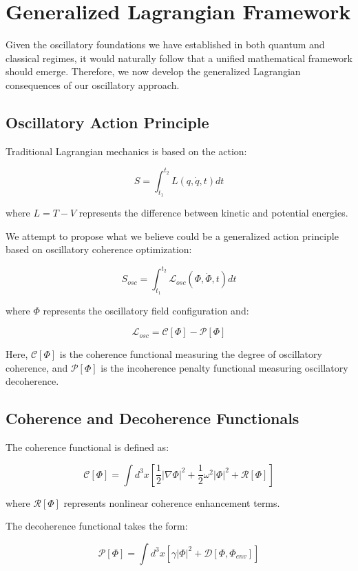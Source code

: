\documentclass[11pt]{article}
\theoremstyle{remark}
\begin{document}
\section{Generalized Lagrangian Framework}

Given the oscillatory foundations we have established in both quantum and classical regimes, it would naturally follow that a unified mathematical framework should emerge. Therefore, we now develop the generalized Lagrangian consequences of our oscillatory approach.

\subsection{Oscillatory Action Principle}

Traditional Lagrangian mechanics is based on the action:

$$S = \int_{t_1}^{t_2} L(q, \dot{q}, t) dt$$

where $L = T - V$ represents the difference between kinetic and potential energies.

We attempt to propose what we believe could be a generalized action principle based on oscillatory coherence optimization:

$$S_{osc} = \int_{t_1}^{t_2} \mathcal{L}_{osc}(\Phi, \dot{\Phi}, t) dt$$

where $\Phi$ represents the oscillatory field configuration and:

$$\mathcal{L}_{osc} = \mathcal{C}[\Phi] - \mathcal{P}[\Phi]$$

Here, $\mathcal{C}[\Phi]$ is the coherence functional measuring the degree of oscillatory coherence, and $\mathcal{P}[\Phi]$ is the incoherence penalty functional measuring oscillatory decoherence.

\subsection{Coherence and Decoherence Functionals}

The coherence functional is defined as:

$$\mathcal{C}[\Phi] = \int d^3x \left[\frac{1}{2}|\nabla\Phi|^2 + \frac{1}{2}\omega^2|\Phi|^2 + \mathcal{R}[\Phi]\right]$$

where $\mathcal{R}[\Phi]$ represents nonlinear coherence enhancement terms.

The decoherence functional takes the form:

$$\mathcal{P}[\Phi] = \int d^3x \left[\gamma|\Phi|^2 + \mathcal{D}[\Phi, \Phi_{env}]\right]$$
\end{document}
